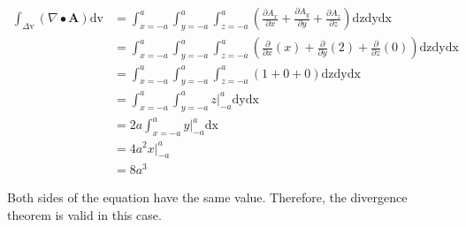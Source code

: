 \documentclass{article}
\begin{document}
\begin{equation*}
	\begin{split}
		\int_{\Delta \text{v}} (\nabla \bullet \mathbf{A})\text{dv} & = \int_{x=-a}^a \int_{y=-a}^a \int_{z=-a}^a \left(\frac{\partial A_x}{\partial x} + \frac{\partial A_y}{\partial y} + \frac{\partial A_z}{\partial z}\right) \text{dzdydx} \\
		& = \int_{x=-a}^a \int_{y=-a}^a \int_{z=-a}^a \left(\frac{\partial}{\partial x}(x) + \frac{\partial}{\partial y}(2) + \frac{\partial}{\partial z}(0)\right) \text{dzdydx} \\
		& = \int_{x=-a}^a \int_{y=-a}^a \int_{z=-a}^a (1 + 0 + 0) \text{dzdydx} \\
		& = \int_{x=-a}^a \int_{y=-a}^a z \rvert_{-a}^a \text{dydx} \\
		& = 2a \int_{x=-a}^a y \rvert_{-a}^a \text{dx} \\
		& = 4a^2 x \rvert_{-a}^a \\
		& = 8a^3
	\end{split}
\end{equation*}

Both sides of the equation have the same value. Therefore, the divergence theorem is valid in this case.
\end{document}
